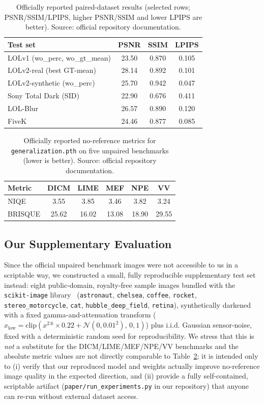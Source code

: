 \documentclass[conference]{IEEEtran}
\begin{document}
\begin{table}[t]
\centering
\caption{Officially reported paired-dataset results (selected rows; PSNR/SSIM/LPIPS, higher PSNR/SSIM and lower LPIPS are better). Source: official repository documentation.}
\label{tab:official}
\begin{tabular}{lccc}
\toprule
Test set & PSNR & SSIM & LPIPS \\
\midrule
LOLv1 (wo\_perc, wo\_gt\_mean) & 23.50 & 0.870 & 0.105 \\
LOLv2-real (best GT-mean) & 28.14 & 0.892 & 0.101 \\
LOLv2-synthetic (wo\_perc) & 25.70 & 0.942 & 0.047 \\
Sony Total Dark (SID) & 22.90 & 0.676 & 0.411 \\
LOL-Blur & 26.57 & 0.890 & 0.120 \\
FiveK & 24.46 & 0.877 & 0.085 \\
\bottomrule
\end{tabular}
\end{table}

\begin{table}[t]
\centering
\caption{Officially reported no-reference metrics for \texttt{generalization.pth} on five unpaired benchmarks (lower is better). Source: official repository documentation.}
\label{tab:official-unpaired}
\begin{tabular}{lccccc}
\toprule
Metric & DICM & LIME & MEF & NPE & VV \\
\midrule
NIQE    & 3.55 & 3.85 & 3.46 & 3.82 & 3.24 \\
BRISQUE & 25.62 & 16.02 & 13.08 & 18.90 & 29.55 \\
\bottomrule
\end{tabular}
\end{table}

\subsection{Our Supplementary Evaluation}
\label{sec:our-eval}
Since the official unpaired benchmark images were not accessible to us in a
scriptable way, we constructed a small, fully reproducible supplementary test
set instead: eight public-domain, royalty-free sample images bundled with the
\texttt{scikit-image} library~\cite{vanderwalt2014scikit}
(\texttt{astronaut}, \texttt{chelsea}, \texttt{coffee}, \texttt{rocket},
\texttt{stereo\_motorcycle}, \texttt{cat}, \texttt{hubble\_deep\_field},
\texttt{retina}), synthetically darkened with a fixed gamma-and-attenuation
transform ($x_{\text{low}} = \mathrm{clip}(x^{2.6}\times 0.22 +
\mathcal{N}(0,0.01^2),\,0,1)$) plus i.i.d. Gaussian sensor-noise, fixed with a
deterministic random seed for reproducibility. We stress that this is
\emph{not} a substitute for the DICM/LIME/MEF/NPE/VV benchmarks and the
absolute metric values are not directly comparable to
Table~\ref{tab:official-unpaired}; it is intended only to (i) verify that our
reproduced model and weights actually improve no-reference image quality in
the expected direction, and (ii) provide a fully self-contained, scriptable
artifact (\texttt{paper/run\_experiments.py} in our repository) that anyone
can re-run without external dataset access.
\end{document}

